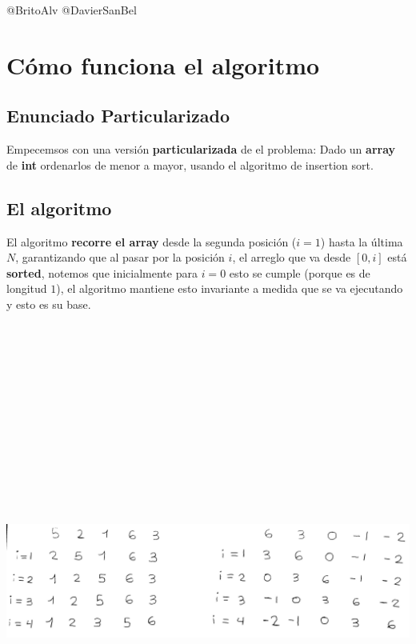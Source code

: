 \documentclass[14pt]{extarticle}
\begin{document}
@BritoAlv @DavierSanBel
\tableofcontents
\section{Cómo funciona el algoritmo}
\subsection{Enunciado Particularizado}
\begin{tcolorbox}[colback=blue!5!white,colframe=blue!75!black, title = Insertion Sort]
Empecemsos con una versión \textbf{particularizada} de el problema: Dado un \textbf{array} de \textbf{int} ordenarlos de menor a mayor, usando el algoritmo de insertion sort. 
\end{tcolorbox}
\subsection{El algoritmo}

El algoritmo \textbf{recorre el array} desde la segunda posición ($i=1$) hasta la última $N$, garantizando que al pasar por la posición $i$, el arreglo que va desde $[0,i]$ está \textbf{sorted}, notemos que inicialmente para $i=0$ esto se cumple (porque es de longitud $1$), el algoritmo mantiene esto invariante a medida que se va ejecutando y esto es su base.
\begin{center}
\includegraphics[width=18cm,height=17cm,keepaspectratio]{Fa}    
\end{center}
\end{document}
